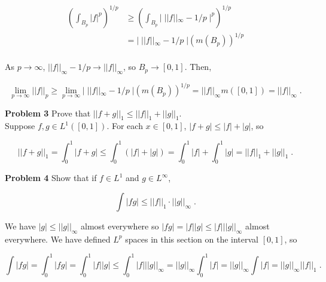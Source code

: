 \documentclass[a4paper]{article}
\begin{document}
\begin{align*}
\left(\int_{B_p} |f|^p \right)^{1/p}& \geq \left(\int_{B_p} |\;||f||_\infty - 1/p \;|^p\right)^{1/p}\\
&=| \; ||f||_\infty - 1/p \;| \left(m(B_p)\right)^{1/p}\\
\end{align*}

As $p \rightarrow \infty$, $||f||_\infty - 1/p \rightarrow ||f||_\infty$, so $B_p \rightarrow [0,1]$. Then,

$$\lim_{p \rightarrow \infty} ||f||_p \geq \lim_{p \rightarrow \infty} | \; ||f||_\infty - 1/p \; | \left(m(B_p)\right)^{1/p} = ||f||_\infty m([0,1]) = ||f||_\infty \;.$$


{\bf Problem 3} Prove that $||f + g||_1 \leq ||f||_1 + ||g||_1$. \\

Suppose $f,g \in L^1([0,1])$. For each $x \in [0,1]$, $|f+g| \leq |f| + |g|$, so

$$||f+g||_1 = \int_0^1 |f+g| \leq \int_0^1 (|f| + |g|)= \int_0^1 |f| + \int_0^1 |g|  = ||f||_1 + ||g||_1 \;.$$

{\bf Problem 4} Show that if $f \in L^1$ and $g \in L^\infty$,

$$\int |fg| \leq ||f||_1 \cdot ||g||_\infty \;.$$

We have $|g| \leq ||g||_\infty$ almost everywhere so $|fg| = |f||g| \leq |f| ||g||_\infty$ almost everywhere. We have defined $L^p$ spaces in this section on the interval $[0,1]$, so

$$\int |fg| = \int_0^1 |fg| = \int_0^1 |f||g| \leq \int_0^1 |f| ||g||_\infty = ||g||_\infty \int_0^1 |f| = ||g||_\infty \int |f| = ||g||_\infty ||f||_1 \;.$$
\end{document}
